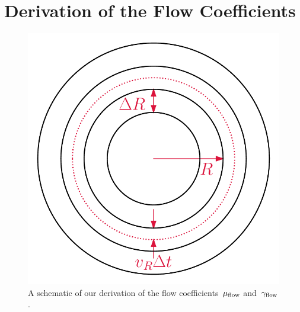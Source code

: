 \documentclass[main.tex]{subfiles}
\begin{document}
\chapter{Derivation of the Flow Coefficients}
\label{outflows:coefficients-derivation}

\begin{figure}
\centering
\includegraphics[scale = 0.5]{chapter7/schematic.pdf}
\caption{
A schematic of our derivation of the flow coefficients~$\mu_{\text{flow}}$
and~$\gamma_{\text{flow}}$.}
\label{outflows:fig:coefficients-schematic}
\end{figure}
\end{document}
